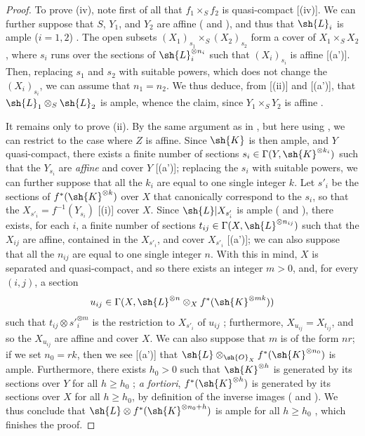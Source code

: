 \begin{proof}
To prove (iv), note first of all that $f_1\times_S f_2$ is quasi-compact [(iv)].
We can further suppose that $S$, $Y_1$, and $Y_2$ are affine ( and ), and thus that $\sh{L}_i$ is ample ($i=1,2$) .
The open subsets $(X_1)_{s_1}\times_S(X_2)_{s_2}$ form a cover of $X_1\times_S X_2$, where $s_i$ runs over the sections of $\sh{L}_i^{\otimes n_i}$ such that $(X_i)_{s_i}$ is affine [(a')].
Then, replacing $s_1$ and $s_2$ with suitable powers, which does not change the $(X_i)_{s_i}$, we can assume that $n_1=n_2$.
We thus deduce, from [(ii)] and [(a')], that $\sh{L}_1\otimes_S\sh{L}_2$ is ample, whence the claim, since $Y_1\times_S Y_2$ is affine .

It remains only to prove (ii).
By the same argument as in , but here using , we can restrict to the case where $Z$ is affine.
Since $\sh{K}$ is then ample, and $Y$ quasi-compact, there exists a finite number of sections $s_i\in\Gamma(Y,\sh{K}^{\otimes k_i})$ such that the $Y_{s_i}$
are \emph{affine} and cover $Y$ [(a')];
replacing the $s_i$ with suitable powers, we can further suppose that all the $k_i$ are equal to one single integer $k$.
Let $s'_i$ be the sections of $f^*(\sh{K}^{\otimes k})$ over $X$ that canonically correspond to the $s_i$, so that the $X_{s'_i}=f^{-1}(Y_{s_i})$ [(i)] cover $X$.
Since $\sh{L}|X_{s'_i}$ is ample ( and ), there exists, for each $i$, a finite number of sections $t_{ij}\in\Gamma(X,\sh{L}^{\otimes n_{ij}})$ such that the $X_{ij}$ are affine, contained in the $X_{s'_i}$, and cover $X_{s'_i}$ [(a')];
we can also suppose that all the $n_{ij}$ are equal to one single integer $n$.
With this in mind, $X$ is separated and quasi-compact, and so there exists an integer $m>0$, and, for every $(i,j)$, a section
\[
  u_{ij}\in\Gamma(X,\sh{L}^{\otimes n}\otimes_X f^*(\sh{K}^{\otimes mk}))
\]
such that $t_{ij}\otimes s'^{\otimes m}_i$ is the restriction to $X_{s'_i}$ of $u_{ij}$ ;
furthermore, $X_{u_{ij}}=X_{t_{ij}}$, and so the $X_{u_{ij}}$ are affine and cover $X$.
We can also suppose that $m$ is of the form $nr$;
if we set $n_0=rk$, then we see [(a')] that $\sh{L}\otimes_{\sh{O}_X}f^*(\sh{K}^{\otimes n_0})$ is ample.
Furthermore, there exists $h_0>0$ such that $\sh{K}^{\otimes h}$ is generated by its sections over $Y$ for all $h\geq h_0$ ;
\emph{a fortiori}, $f^*(\sh{K}^{\otimes h})$ is generated by its sections over $X$ for all $h\geq h_0$, by definition of the inverse images ( and ).
We thus conclude that $\sh{L}\otimes f^*(\sh{K}^{\otimes n_0+h})$ is ample for all $h\geq h_0$ , which finishes the proof.
\end{proof}

